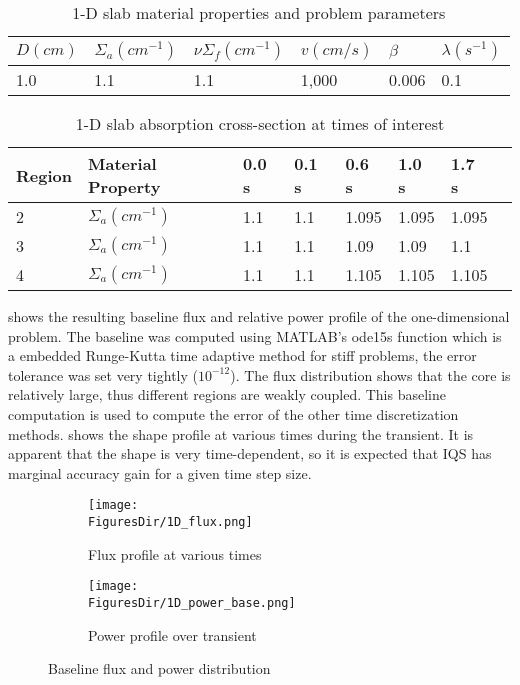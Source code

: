 \begin{table}[!htbp]
\begin{center}
\caption{1-D slab material properties and problem parameters \cite{PrincePHYSOR2016}}
\label{tab:1Dmat}
\begin{tabular}{llllll}
\hline
$D (cm)$ & $\Sigma_a (cm^{-1})$ & $\nu \Sigma_f (cm^{-1})$ & $v (cm/s)$ & $\beta$ & $\lambda (s^{-1})$ \\
\hline
1.0 & 1.1 & 1.1 & 1,000 & 0.006 & 0.1 \\

\hline
\end{tabular}
\end{center}
\end{table}

\begin{table}[!htbp]
\begin{center}
\caption{1-D slab absorption cross-section at times of interest \cite{PrincePHYSOR2016}}
\label{tab:1Dslope}
\begin{tabular}{llllllll}
\hline
Region & Material Property & 0.0 s & 0.1 s & 0.6 s & 1.0 s & 1.7 s \\
\hline
2 & $\Sigma_{a} (cm^{-1})$ & 1.1 & 1.1 & 1.095 & 1.095 & 1.095 \\
3 & $\Sigma_{a} (cm^{-1})$ & 1.1 & 1.1 & 1.09 & 1.09 & 1.1 \\
4 & $\Sigma_{a} (cm^{-1})$ & 1.1 & 1.1 & 1.105 & 1.105 & 1.105 \\
\hline
\end{tabular}
\end{center}
\end{table}

 shows the resulting baseline flux and relative power profile of the one-dimensional problem.  The baseline was computed using MATLAB's ode15s function which is a embedded Runge-Kutta time adaptive method for stiff problems, the error tolerance was set very tightly ($10^{-12}$).  The flux distribution shows that the core is relatively large, thus different regions are weakly coupled. This baseline computation is used to compute the error of the other time discretization methods.   shows the shape profile at various times during the transient.  It is apparent that the shape is very time-dependent, so it is expected that IQS has marginal accuracy gain for a given time step size.

\begin{figure}[!htbp]
\centering
\begin{subfigure}[b]{0.49\textwidth}
\centering
\texttt{[image: \\FiguresDir/1D\_flux.png]}
\caption{Flux profile at various times}
\end{subfigure}
\begin{subfigure}[b]{0.49\textwidth}
\centering
\texttt{[image: \\FiguresDir/1D\_power\_base.png]}
\caption{Power profile over transient}
\end{subfigure}
\caption{Baseline flux and power distribution}
\label{fig:1D_flux}
\end{figure}

